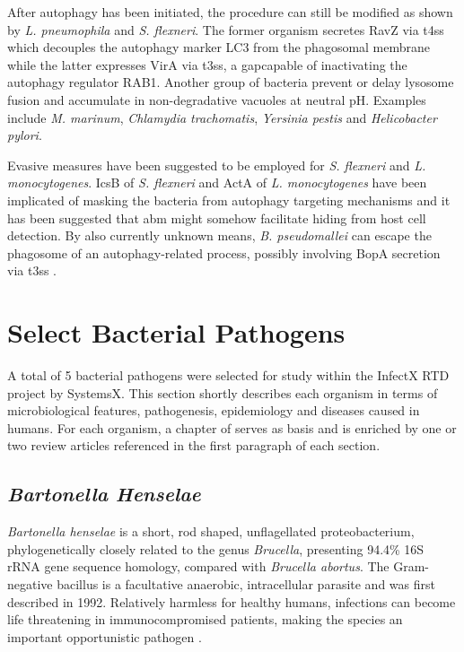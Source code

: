 After autophagy has been initiated, the procedure can still be modified as shown by \textit{L. pneumophila} and \textit{S. flexneri}. The former organism secretes RavZ via \gls{t4ss} which decouples the autophagy marker LC3 from the phagosomal membrane while the latter expresses VirA via \gls{t3ss}, a \gls{gap}capable of inactivating the autophagy regulator RAB1. Another group of bacteria prevent or delay lysosome fusion and accumulate in non-degradative vacuoles at neutral pH. Examples include \textit{M. marinum}, \textit{Chlamydia trachomatis}, \textit{Yersinia pestis} and \textit{Helicobacter pylori}.

Evasive measures have been suggested to be employed for \textit{S. flexneri} and \textit{L. monocytogenes}. IcsB of \textit{S. flexneri} and ActA of \textit{L. monocytogenes} have been implicated of masking the bacteria from autophagy targeting mechanisms and it has been suggested that \gls{abm} might somehow facilitate hiding from host cell detection. By also currently unknown means, \textit{B. pseudomallei} can escape the phagosome of an autophagy-related process, possibly involving BopA secretion via \gls{t3ss} \citep{Huang2014}.

\section{Select Bacterial Pathogens}

A total of 5 bacterial pathogens were selected for study within the InfectX RTD project by SystemsX. This section shortly describes each organism in terms of microbiological features, pathogenesis, epidemiology and diseases caused in humans. For each organism, a chapter of \cite{Rolain2006} serves as basis and is enriched by one or two review articles referenced in the first paragraph of each section.

\subsection{\textit{Bartonella Henselae}}

\textit{Bartonella henselae} is a short, rod shaped, unflagellated proteobacterium, phylogenetically closely related to the genus \textit{Brucella}, presenting 94.4\% 16S rRNA gene sequence homology, compared with \textit{Brucella abortus}. The Gram-negative bacillus is a facultative anaerobic, intracellular parasite and was first described in 1992. Relatively harmless for healthy humans, infections can become life threatening in immunocompromised patients, making the species an important opportunistic pathogen \citep{Anderson1997}.

